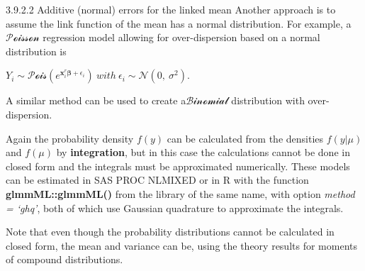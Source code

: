 \documentclass[
  9pt,
  ignorenonframetext,
]{beamer}
\begin{document}
\begin{frame}{}
\protect\hypertarget{section-10}{}
\begin{block}{3.9.2.2 Additive (normal) errors for the linked mean}
\protect\hypertarget{additive-normal-errors-for-the-linked-mean}{}
Another approach is to assume the link function of the mean has a normal
distribution. For example, a \(\mathcal {Poisson}\) regression model
allowing for over-dispersion based on a normal distribution is

\(Y_i \sim \mathcal {Pois} (e^{\pmb x_i^r \pmb \beta+\epsilon_i})\ with\ \epsilon_i\sim \mathcal N(0,\ \sigma^2)\).

A similar method can be used to create a\(\mathcal {Binomial}\)
distribution with over-dispersion.

Again the probability density \(f(y)\) can be calculated from the
densities \(f(y|\mu)\) and \(f(\mu)\) by \textbf{integration}, but in
this case the calculations cannot be done in closed form and the
integrals must be approximated numerically. These models can be
estimated in SAS PROC NLMIXED or in R with the function
\textbf{glmmML::glmmML()} from the library of the same name, with option
\emph{method = `ghq'}, both of which use Gaussian quadrature to
approximate the integrals.

Note that even though the probability distributions cannot be calculated
in closed form, the mean and variance can be, using the theory results
for moments of compound distributions.
\end{block}
\end{frame}
\end{document}
